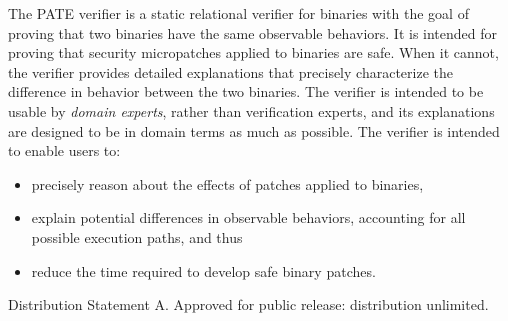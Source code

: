 The PATE verifier is a static relational verifier for binaries with the
goal of proving that two binaries have the same observable behaviors.
It is intended for proving that security micropatches applied to
binaries are safe.  When it cannot, the verifier provides detailed
explanations that precisely characterize the difference in behavior
between the two binaries.  The verifier is intended to be usable by
\emph{domain experts}, rather than verification experts, and its
explanations are designed to be in domain terms as much as possible.
The verifier is intended to enable users to:
\begin{itemize}
\item precisely reason about the effects of patches applied to binaries,
\item explain potential differences in observable behaviors, accounting
  for all possible execution paths, and thus
\item reduce the time required to develop safe binary patches.
\end{itemize}

\vspace{0.25in}

\noindent\small{Distribution Statement A. Approved for public release: distribution unlimited.}

